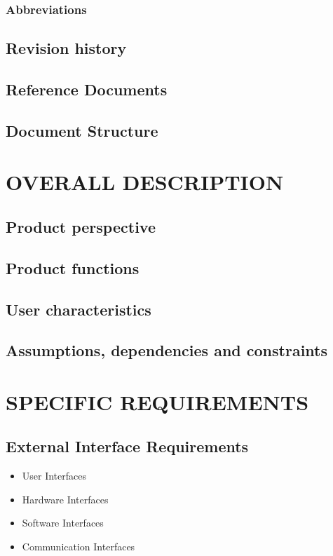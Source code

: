 \documentclass{article}
\begin{document}
\subsubsection{Abbreviations}

\subsection{Revision history}
\subsection{Reference Documents}
\subsection{Document Structure}

\section{OVERALL DESCRIPTION}

\subsection{Product perspective}
\subsection{Product functions}
\subsection{User characteristics}
\subsection{Assumptions, dependencies and constraints}

\section{SPECIFIC REQUIREMENTS}
\subsection{External Interface Requirements}
		\begin{itemize}
			\item User Interfaces
			\item Hardware Interfaces
			\item Software Interfaces
			\item Communication Interfaces
		\end{itemize}
\end{document}

